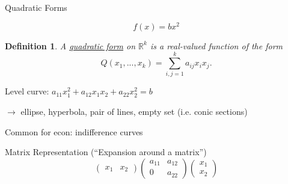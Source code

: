 \documentclass[xcolor=dvipsnames, compress, t]{beamer}
\newtheorem{defin}{Definition}
\newcommand{\vs}{\vspace{\baselineskip}}
\begin{document}
	\begin{frame}{Quadratic Forms}
		
		{\color{Orchid} $$f(x) = bx^2$$} 
		
		\vspace{-\baselineskip}
		
		\begin{defin}
			A \underline{quadratic form} on $\mathds{R}^k$ is a real-valued function of the form $$Q(x_1, ..., x_k) = \sum_{i, j=1}^k a_{ij} x_i x_j.$$
		\end{defin} \pause
		
		Level curve:  $a_{11} x_1^2 + a_{12} x_1 x_2 + a_{22} x_2^2 = b$
		
		$\rightarrow$ ellipse, hyperbola, pair of lines, empty set (i.e. conic sections) 
		
		{\color{MidnightBlue} Common for econ: indifference curves}\pause
		
		\vs Matrix Representation (``Expansion around a matrix'')
		$$\begin{pmatrix}x_1 & x_2 \end{pmatrix} \begin{pmatrix} a_{11} & a_{12} \\ 0 & a_{22} \end{pmatrix} \begin{pmatrix} x_1 \\ x_2 \end{pmatrix} $$
		
	\end{frame}
\end{document}
